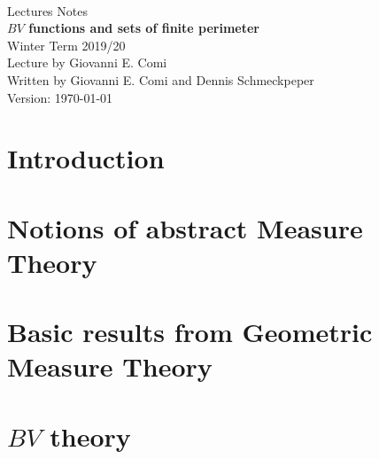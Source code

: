 \documentclass[ngerman]{report}
\begin{document}
\begin{titlepage}
  \centering\text{}\\[14ex]
  \Huge Lectures Notes\\[2ex]
  \Huge {\bf $BV$ functions and sets of finite perimeter}\\[18ex]
  \LARGE Winter Term 2019/20\\[22ex]
  Lecture by Giovanni E. Comi\\[2ex]
  Written by Giovanni E. Comi and Dennis Schmeckpeper\\[8ex]
  \Large Version: \today\\
\end{titlepage}
\tableofcontents
\chapter*{Introduction}

\chapter{Notions of abstract Measure Theory}

\chapter{Basic results from Geometric Measure Theory}

\chapter{$BV$ theory}


\cleardoublepage 


\end{document}
